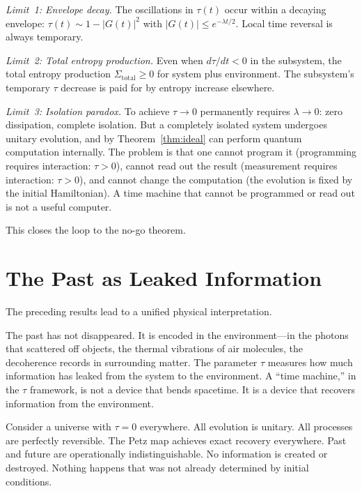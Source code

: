 \documentclass[prl,twocolumn,superscriptaddress,longbibliography,floatfix]{revtex4-2}
\newcommand{\tauasym}{\tau}
\begin{document}
\emph{Limit~1: Envelope decay.}  The oscillations in $\tauasym(t)$
occur within a decaying envelope:
$\tauasym(t) \sim 1 - |G(t)|^2$ with
$|G(t)| \leq e^{-\lambda t/2}$.  Local time reversal is always
temporary.

\emph{Limit~2: Total entropy production.}  Even when
$d\tauasym/dt < 0$ in the subsystem, the total entropy production
$\Sigma_{\mathrm{total}} \geq 0$ for system plus environment.  The
subsystem's temporary $\tauasym$ decrease is paid for by entropy
increase elsewhere.

\emph{Limit~3: Isolation paradox.}  To achieve $\tauasym \to 0$
permanently requires $\lambda \to 0$: zero dissipation, complete
isolation.  But a completely isolated system undergoes unitary
evolution, and by Theorem~\ref{thm:ideal} can perform quantum
computation internally.  The problem is that one cannot program it
(programming requires interaction: $\tauasym > 0$), cannot read out
the result (measurement requires interaction: $\tauasym > 0$), and
cannot change the computation (the evolution is fixed by the initial
Hamiltonian).  A time machine that cannot be programmed or read out
is not a useful computer.

This closes the loop to the no-go theorem.

\section{The Past as Leaked Information}
\label{sec:past}

The preceding results lead to a unified physical interpretation.

The past has not disappeared.  It is encoded in the
environment---in the photons that scattered off objects, the
thermal vibrations of air molecules, the decoherence records in
surrounding matter.  The parameter $\tauasym$ measures how much
information has leaked from the system to the environment.  A
``time machine,'' in the $\tauasym$ framework, is not a device
that bends spacetime.  It is a device that recovers information
from the environment.

Consider a universe with $\tauasym = 0$ everywhere.  All evolution is
unitary.  All processes are perfectly reversible.  The Petz map
achieves exact recovery everywhere.  Past and future are operationally
indistinguishable.  No information is created or destroyed.  Nothing
happens that was not already determined by initial conditions.
\end{document}
